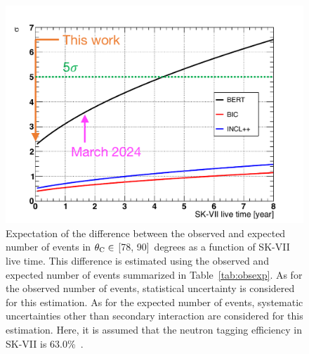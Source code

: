 \begin{figure}[h]
	\centering
	\includegraphics[width=12cm]{Figures/Conclusion/model}
	\caption[Expectation of the difference between the observed and expected number of events in $\theta_{\rm C}\in$ , 90\rbrack~degrees as a function of SK-VII live time]{
	Expectation of the difference between the observed and expected number of events in $\theta_{\rm C}\in$ [78, 90]~degrees as a function of SK-VII live time.
	This difference is estimated using the observed and expected number of events summarized in Table~\ref{tab:obsexp}.
	As for the observed number of events, statistical uncertainty is considered for this estimation.
	As for the expected number of events, systematic uncertainties other than secondary interaction are considered for this estimation.
	Here, it is assumed that the neutron tagging efficiency in SK-VII is 63.0\%~\cite{2023KanemuraSlide}.
	}\label{Future_Model_Comp_model}
\end{figure}





\clearpage

